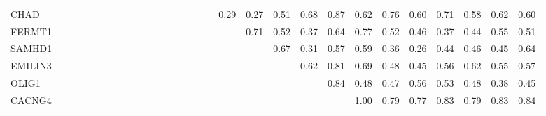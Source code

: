 \begin{longtable}{lrrrrrrrrrrrrrrrrrrrrrrrrrrrr}
CHAD     &              &            &            &               &              &             &              &               &             &              &              &             &              &             &             &            &         0.29 &         0.27 &          0.51 &        0.68 &         0.87 &      0.62 &         0.76 &       0.60 &       0.71 &          0.58 &           0.62 &        0.60 \\
FERMT1   &              &            &            &               &              &             &              &               &             &              &              &             &              &             &             &            &              &         0.71 &          0.52 &        0.37 &         0.64 &      0.77 &         0.52 &       0.46 &       0.37 &          0.44 &           0.55 &        0.51 \\
SAMHD1   &              &            &            &               &              &             &              &               &             &              &              &             &              &             &             &            &              &              &          0.67 &        0.31 &         0.57 &      0.59 &         0.36 &       0.26 &       0.44 &          0.46 &           0.45 &        0.64 \\
EMILIN3  &              &            &            &               &              &             &              &               &             &              &              &             &              &             &             &            &              &              &               &        0.62 &         0.81 &      0.69 &         0.48 &       0.45 &       0.56 &          0.62 &           0.55 &        0.57 \\
OLIG1    &              &            &            &               &              &             &              &               &             &              &              &             &              &             &             &            &              &              &               &             &         0.84 &      0.48 &         0.47 &       0.56 &       0.53 &          0.48 &           0.38 &        0.45 \\
CACNG4   &              &            &            &               &              &             &              &               &             &              &              &             &              &             &             &            &              &              &               &             &              &      1.00 &         0.79 &       0.77 &       0.83 &          0.79 &           0.83 &        0.84 \\

\end{longtable}
